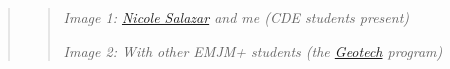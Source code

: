 \documentclass[
  letterpaper,
  DIV=11,
  numbers=noendperiod]{scrartcl}
\begin{document}
\begin{quote}
\begin{quote}
\hfill\break
\emph{Image 1: \href{https://www.linkedin.com/in/nicolesalazarc/}{Nicole
Salazar} and me (CDE students present)}

\emph{Image 2: With other EMJM+ students (the
\href{https://mastergeotech.info/}{Geotech} program)}
\end{quote}
\end{quote}
\end{document}
